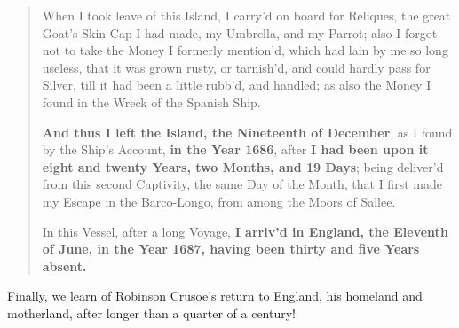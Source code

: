 \documentclass[a4paper]{article}
\begin{document}
\noindent
\begin{minipage}{1\textwidth}
\vspace{1em}
\begin{quotation}
{\ttfamily


When I took leave of this Island, I carry’d on board for Reliques, the great Goat’s-Skin-Cap I had made, my Umbrella, and my Parrot; also I forgot not to take the Money I formerly mention’d, which had lain by me so long useless, that it was grown rusty, or tarnish’d, and could hardly pass for Silver, till it had been a little rubb’d, and handled; as also the Money I found in the Wreck of the Spanish Ship.

\textbf{And thus I left the Island, the Nineteenth of December}, as I found by the Ship’s Account, \textbf{in the Year 1686}, after \textbf{I had been upon it eight and twenty Years, two Months, and 19 Days};  being deliver’d from this second Captivity, the same Day of the Month, that I first made my Escape in the Barco-Longo, from among the Moors of Sallee.

In this Vessel, after a long Voyage, \textbf{I arriv’d in England, the Eleventh of June, in the Year 1687, having been thirty and five Years absent.}


}
\end{quotation}
\vspace{1em}
\end{minipage}



Finally, we learn of Robinson Crusoe's return to England, his homeland and motherland, after longer than a quarter of a century! 
\end{document}
